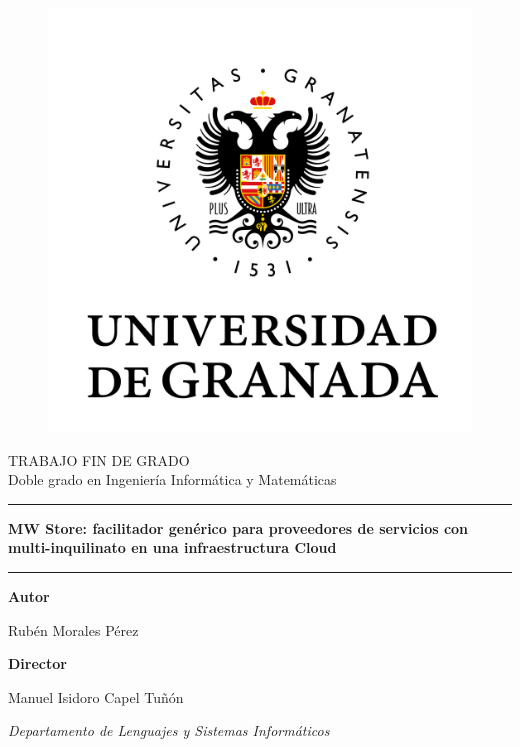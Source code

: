 \documentclass[11pt,english]{article} %
\title{  } %
\author{ }
\date{ } %
\begin{document}
\begin{figure}[H]
  \centering
  \includegraphics[scale=0.4]{img/logo_ugr.png}
\end{figure}

\begin{center}
  \Large TRABAJO FIN DE GRADO\\ 
  \large Doble grado en Ingeniería Informática y Matemáticas
  \vspace{0.7cm}

  \hrule
  \vspace{0.2cm}
  \textbf{\LARGE MW Store: facilitador genérico para proveedores de servicios con multi-inquilinato en una infraestructura Cloud}
  \vspace{0.2cm}
  \hrule
  \vspace{2cm}
  
  \textbf{Autor}

  Rubén Morales Pérez

  \vspace{2cm}
  \textbf{Director}

  Manuel Isidoro Capel Tuñón

  \textit{Departamento de Lenguajes y Sistemas Informáticos}
\end{center}

\newpage

\ 
\thispagestyle{empty}
\end{document}
